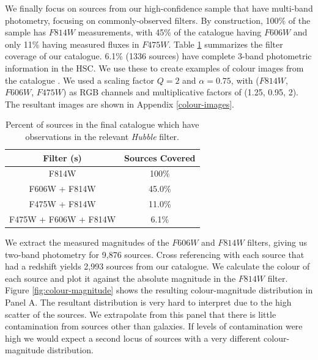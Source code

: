 {We finally focus on sources from our high-confidence sample that have multi-band photometry, focusing on commonly-observed filters. By construction, 100\% of the sample has $F814W$ measurements, with 45\% of the catalogue having $F606W$ and only 11\% having measured fluxes in $F475W$. Table \ref{tab:filters-breakdown} summarizes the filter coverage of our catalogue. 6.1\% (1336 sources) have complete 3-band photometric information in the HSC. We use these to create examples of colour images from the catalogue \citep[using the algorithm of][]{2004PASP..116..133L}. We used a scaling factor $Q = 2$ and $\alpha = 0.75$, with ($F814W$, $F606W$, $F475W$) as RGB channels and multiplicative factors of (1.25, 0.95, 2). The resultant images are shown in Appendix \ref{colour-images}.

\begin{table}
\centering
	\begin{tabular}{|c|c|}
	  \hline
	  Filter (s) & Sources Covered \\
	  \hline
	  F814W & 100\% \\
	  F606W + F814W & 45.0\% \\
	  F475W + F814W & 11.0\% \\
	  F475W + F606W + F814W & 6.1\% \\
	  \hline
	\end{tabular}
  \caption{Percent of sources in the final catalogue which have observations in the relevant \emph{Hubble} filter.}
 \label{tab:filters-breakdown}
\end{table}

We extract the measured magnitudes of the $F606W$ and $F814W$ filters, giving us two-band photometry for 9,876 sources. Cross referencing with each source that had a redshift yields 2,993 sources from our catalogue. We calculate the colour of each source and plot it against the absolute magnitude in the $F814W$ filter. Figure \ref{fig:colour-magnitude} shows the resulting colour-magnitude distribution in Panel A. The resultant distribution is very hard to interpret due to the high scatter of the sources. We extrapolate from this panel that there is little contamination from sources other than galaxies. If levels of contamination were high we would expect a second locus of sources with a very different colour-magnitude distribution.

}

